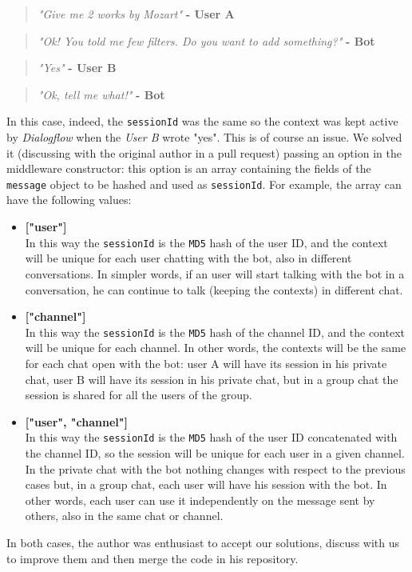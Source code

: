 	\begin{verse}
		\textit{"Give me 2 works by Mozart"} \textbf{- User A}
	\end{verse}
	\begin{verse}
		\textit{"Ok! You told me few filters. Do you want to add something?"} \textbf{- Bot}
	\end{verse}
	\begin{verse}
		\textit{"Yes"} \textbf{- User B}
	\end{verse}
	\begin{verse}
		\textit{"Ok, tell me what!"} \textbf{- Bot}
	\end{verse}
	In this case, indeed, the \texttt{sessionId} was the same so the context was kept active by \textit{Dialogflow} when the \textit{User B} wrote "yes".
	This is of course an issue. We solved it (discussing with the original author in a pull request\cite{pr2}) passing an option in the middleware constructor: this option is an array containing the fields of the \texttt{message} object to be hashed and used as \texttt{sessionId}. For example, the array can have the following values:
	\begin{itemize}
		\item \textbf{["user"]}\\
		In this way the \texttt{sessionId} is the \texttt{MD5} hash of the user ID, and the context will be unique for each user chatting with the bot, also in different conversations. In simpler words, if an user will start talking with the bot in a conversation, he can continue to talk (keeping the contexts) in different chat.
		
		\item \textbf{["channel"]}\\
		In this way the \texttt{sessionId} is the \texttt{MD5} hash of the channel ID, and the context will be unique for each channel. In other words, the contexts will be the same for each chat open with the bot: user A will have its session in his private chat, user B will have its session in his private chat, but in a group chat the session is shared for all the users of the group.
		
		\item \textbf{["user", "channel"]}\\
		In this way the \texttt{sessionId} is the \texttt{MD5} hash of the user ID concatenated with the channel ID, so the session will be unique for each user in a given channel. In the private chat with the bot nothing changes with respect to the previous cases but, in a group chat, each user will have his session with the bot. In other words, each user can use it independently on the message sent by others, also in the same chat or channel.
	\end{itemize}
	In both cases, the author was enthusiast to accept our solutions, discuss with us to improve them and then merge the code in his repository.
	